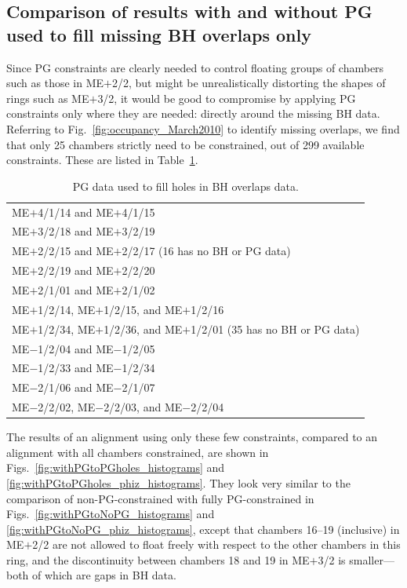 \documentclass[12pt]{article}
\begin{document}
\subsection{Comparison of results with and without PG used to fill
  missing BH overlaps only}

Since PG constraints are clearly needed to control floating groups of
chambers such as those in ME$+$2/2, but might be unrealistically
distorting the shapes of rings such as ME$+$3/2, it would be good to
compromise by applying PG constraints only where they are needed:
directly around the missing BH data.  Referring to
Fig.~\ref{fig:occupancy_March2010} to identify missing overlaps, we
find that only 25 chambers strictly need to be constrained, out of 299
available constraints.  These are listed in Table~\ref{tab:pgholes}.

\begin{table}
\caption{PG data used to fill holes in BH overlaps data. \label{tab:pgholes}}
\begin{center}
\begin{tabular}{l}
ME$+$4/1/14 and ME$+$4/1/15 \\
ME$+$3/2/18 and ME$+$3/2/19 \\
ME$+$2/2/15 and ME$+$2/2/17 (16 has no BH or PG data) \\
ME$+$2/2/19 and ME$+$2/2/20 \\
ME$+$2/1/01 and ME$+$2/1/02 \\
ME$+$1/2/14, ME$+$1/2/15, and ME$+$1/2/16 \\
ME$+$1/2/34, ME$+$1/2/36, and ME$+$1/2/01 (35 has no BH or PG data) \\
ME$-$1/2/04 and ME$-$1/2/05 \\
ME$-$1/2/33 and ME$-$1/2/34 \\
ME$-$2/1/06 and ME$-$2/1/07 \\
ME$-$2/2/02, ME$-$2/2/03, and ME$-$2/2/04
\end{tabular}
\end{center}
\end{table}

The results of an alignment using only these few constraints, compared
to an alignment with all chambers constrained, are shown in
Figs.~\ref{fig:withPGtoPGholes_histograms} and
\ref{fig:withPGtoPGholes_phiz_histograms}.  They look very similar to
the comparison of non-PG-constrained with fully PG-constrained in
Figs.~\ref{fig:withPGtoNoPG_histograms} and
\ref{fig:withPGtoNoPG_phiz_histograms}, except that chambers 16--19
(inclusive) in ME$+$2/2 are not allowed to float freely with respect
to the other chambers in this ring, and the discontinuity between
chambers 18 and 19 in ME$+$3/2 is smaller--- both of which are gaps in
BH data.
\end{document}
